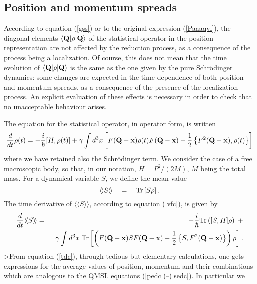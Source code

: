 \documentclass[10pt,a4paper]{article}
\newcommand{\llangle}{\langle\!\langle}
\newcommand{\rrangle}{\rangle\!\rangle}
\begin{document}
\subsection{Position and momentum spreads} \label{sec74}

According to equation (\ref{gss}) or to the original expression
(\ref{Paaaqvl}), the diagonal elements $\langle {\bf Q}| \rho
|{\bf Q} \rangle$ of the statistical operator in the position
representation are not affected by the reduction process, as a
consequence of the process being a localization. Of course, this
does not mean that the time evolution of $\langle {\bf Q}| \rho
|{\bf Q} \rangle$ is the same as the one given by the pure
Schr\"odinger dynamics: some changes are expected in the time
dependence of both position and momentum spreads, as a consequence
of the presence of the localization process. An explicit
evaluation of these effects is necessary in order to check that no
unacceptable behaviour arises.
\par The equation for the statistical operator, in operator form,
is written
\begin{equation} \label{vfc}
\frac{d}{dt} \rho(t) =  - \frac{i}{\hbar} [H, \rho(t)] + \gamma
\int d^3 x \left[ F({\bf Q} - {\bf x}) \rho(t) F({\bf Q} - {\bf
x}) - \frac{1}{2} \left\{ F^2({\bf Q} - {\bf x}), \rho(t) \right\}
\right]
\end{equation}
where we have retained also the Schr\"odinger term. We consider the case
of a free macroscopic body, so that, in our notation, $H = P^2 /
(2M)$, $M$ being the total mass. For a dynamical variable $S$, we
define the mean value
\begin{equation}
\llangle S \rrangle \quad = \quad \makebox{Tr} \left[ S \rho
\right].
\end{equation}
The time derivative of $\llangle S \rrangle$, according to
equation (\ref{vfc}), is given by
\begin{eqnarray} \label{tdc}
\frac{d}{dt} \llangle S \rrangle & = &  -\frac{i}{\hbar}
\makebox{Tr} \left( [S,H] \rho \right) \; + \\
& & \;\; \gamma \int d^3 x \;\makebox{Tr} \left[ \left( F({\bf Q}
- {\bf x}) S F({\bf Q} - {\bf x}) - \frac{1}{2} \left\{ S,
F^2({\bf Q} - {\bf x}) \right\} \right) \rho \right]. \nonumber
\end{eqnarray}
>From equation (\ref{tdc}), through tedious but elementary
calculations, one gets expressions for the average values of
position, momentum and their combinations which are analogous to
the QMSL equations (\ref{pedc})--(\ref{sedc}). In particular we
\end{document}
